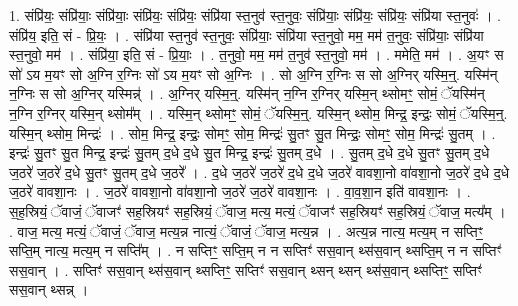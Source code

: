 \documentclass[17pt]{extarticle}
\begin{document}
1. संप्रि॑यः॒ संप्रि॑याः॒ संप्रि॑याः॒ संप्रि॑यः॒ संप्रि॑यः॒ संप्रि॑या स्त॒नुव॑ स्त॒नुवः॒ संप्रि॑याः॒ संप्रि॑यः॒ संप्रि॑यः॒ संप्रि॑या स्त॒नुवः॑ । . संप्रि॑य॒ इति॒ सं - प्रि॒यः॒ । . संप्रि॑या स्त॒नुव॑ स्त॒नुवः॒ संप्रि॑याः॒ संप्रि॑या स्त॒नुवो॒ मम॒ मम॑ त॒नुवः॒ संप्रि॑याः॒ संप्रि॑या स्त॒नुवो॒ मम॑ । . संप्रि॑या॒ इति॒ सं - प्रि॒याः॒ । . त॒नुवो॒ मम॒ मम॑ त॒नुव॑ स्त॒नुवो॒ मम॑ । . ममेति॒ मम॑ । . अ॒यꣳ स सो॑ ऽय म॒यꣳ सो अ॒ग्नि र॒ग्निः सो॑ ऽय म॒यꣳ सो अ॒ग्निः । . सो अ॒ग्नि र॒ग्निः स सो अ॒ग्निर् यस्मि॒न्॒. यस्मि॑न् न॒ग्निः स सो अ॒ग्निर् यस्मिन्न्॑ । . अ॒ग्निर् यस्मि॒न्॒. यस्मि॑न् न॒ग्नि र॒ग्निर् यस्मि॒न् थ्सोमꣳ॒॒ सोमं॒ ॅयस्मि॑न् न॒ग्नि र॒ग्निर् यस्मि॒न् थ्सोम᳚म् । . यस्मि॒न् थ्सोमꣳ॒॒ सोमं॒ ॅयस्मि॒न्॒. यस्मि॒न् थ्सोम॒ मिन्द्र॒ इन्द्रः॒ सोमं॒ ॅयस्मि॒न्॒. यस्मि॒न् थ्सोम॒ मिन्द्रः॑ । . सोम॒ मिन्द्र॒ इन्द्रः॒ सोमꣳ॒॒ सोम॒ मिन्द्रः॑ सु॒तꣳ सु॒त मिन्द्रः॒ सोमꣳ॒॒ सोम॒ मिन्द्रः॑ सु॒तम् । . इन्द्रः॑ सु॒तꣳ सु॒त मिन्द्र॒ इन्द्रः॑ सु॒तम् द॒धे द॒धे सु॒त मिन्द्र॒ इन्द्रः॑ सु॒तम् द॒धे । . सु॒तम् द॒धे द॒धे सु॒तꣳ सु॒तम् द॒धे ज॒ठरे॑ ज॒ठरे॑ द॒धे सु॒तꣳ सु॒तम् द॒धे ज॒ठरे᳚ । . द॒धे ज॒ठरे॑ ज॒ठरे॑ द॒धे द॒धे ज॒ठरे॑ वावशा॒नो वा॑वशा॒नो ज॒ठरे॑ द॒धे द॒धे ज॒ठरे॑ वावशा॒नः । . ज॒ठरे॑ वावशा॒नो वा॑वशा॒नो ज॒ठरे॑ ज॒ठरे॑ वावशा॒नः । . वा॒व॒शा॒न इति॑ वावशा॒नः । . स॒ह॒स्रियं॒ ॅवाजं॒ ॅवाजꣳ॑ सह॒स्रियꣳ॑ सह॒स्रियं॒ ॅवाज॒ मत्य॒ मत्यं॒ ॅवाजꣳ॑ सह॒स्रियꣳ॑ सह॒स्रियं॒ ॅवाज॒ मत्य᳚म् । . वाज॒ मत्य॒ मत्यं॒ ॅवाजं॒ ॅवाज॒ मत्य॒न्न नात्यं॒ ॅवाजं॒ ॅवाज॒ मत्य॒न्न । . अत्य॒न्न नात्य॒ मत्य॒म् न सप्तिꣳ॒॒ सप्ति॒म् नात्य॒ मत्य॒म् न सप्ति᳚म् । . न सप्तिꣳ॒॒ सप्ति॒म् न न सप्तिꣳ॑ सस॒वान् थ्स॑स॒वान् थ्सप्ति॒म् न न सप्तिꣳ॑ सस॒वान् । . सप्तिꣳ॑ सस॒वान् थ्स॑स॒वान् थ्सप्तिꣳ॒॒ सप्तिꣳ॑ सस॒वान् थ्सन् थ्सन् थ्स॑स॒वान् थ्सप्तिꣳ॒॒ सप्तिꣳ॑ सस॒वान् थ्सन्न् । \newline
\end{document}

